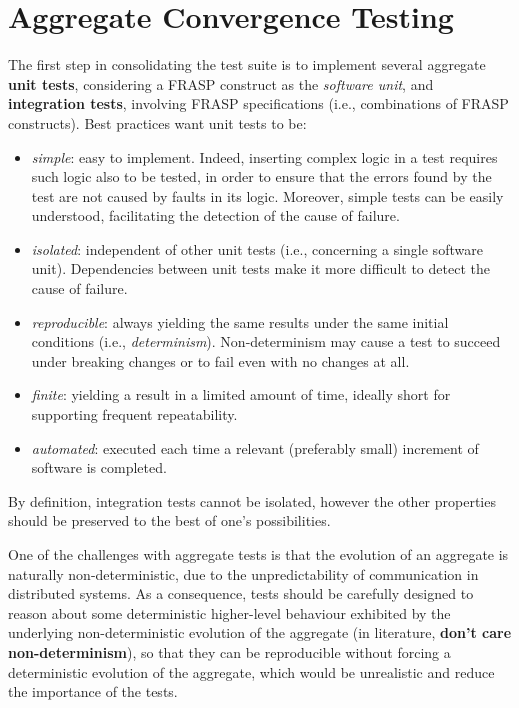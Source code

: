
\section{Aggregate Convergence Testing}
\label{section:analysis:aggregate-convergence-testing}

The first step in consolidating the test suite is to implement several
aggregate \textbf{unit tests}, considering a FRASP construct as the
\textit{software unit}, and \textbf{integration tests}, involving FRASP
specifications (i.e., combinations of FRASP constructs). Best practices
\cite{UnitTesting} want unit tests to be:
\begin{itemize}
  \item \textit{simple}: easy to implement. Indeed, inserting complex logic in
        a test requires such logic also to be tested, in order to ensure that
        the errors found by the test are not caused by faults in its logic.
        Moreover, simple tests can be easily understood, facilitating the
        detection of the cause of failure.
  \item \textit{isolated}: independent of other unit tests (i.e., concerning
        a single software unit). Dependencies between unit tests make it more
        difficult to detect the cause of failure.
  \item \textit{reproducible}: always yielding the same results under the same
        initial conditions (i.e., \textit{determinism}). Non-determinism may
        cause a test to succeed under breaking changes or to fail even with
        no changes at all.
  \item \textit{finite}: yielding a result in a limited amount of time, ideally
        short for supporting frequent repeatability.
  \item \textit{automated}: executed each time a relevant (preferably small)
        increment of software is completed.
\end{itemize}

By definition, integration tests cannot be isolated, however the other
properties should be preserved to the best of one's possibilities.

One of the challenges with aggregate tests is that the evolution of an
aggregate is naturally non-deterministic, due to the unpredictability of
communication in distributed systems. As a consequence, tests should be
carefully designed to reason about some deterministic higher-level behaviour
exhibited by the underlying non-deterministic evolution of the aggregate (in
literature, \textbf{don't care non-determinism}), so that they can be
reproducible without forcing a deterministic evolution of the aggregate, which
would be unrealistic and reduce the importance of the tests.

